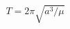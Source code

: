 \documentclass{article}
\begin{document}
    \begin{equation}
        T = 2\pi \sqrt{a^3 / \mu}
    \end{equation}
\end{document}
